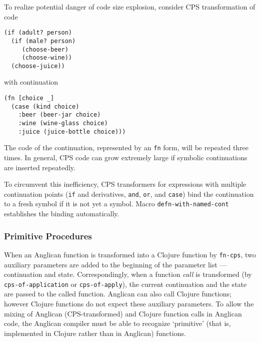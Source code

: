 \documentclass[preprint]{sigplanconf}
\begin{document}
To realize potential danger of code size explosion, consider
CPS transformation of code
\begin{lstlisting}[style=default]
(if (adult? person)
  (if (male? person)
     (choose-beer)
     (choose-wine))
  (choose-juice))
\end{lstlisting}
with continuation 
\begin{lstlisting}[style=default]
(fn [choice _]
  (case (kind choice)
    :beer (beer-jar choice)
    :wine (wine-glass choice)
    :juice (juice-bottle choice)))
\end{lstlisting}
The code of the continuation, represented by an \texttt{fn}
form, will be repeated three times. In general, CPS code can
grow extremely large if symbolic continuations are inserted
repeatedly.

To circumvent this inefficiency, CPS transformers for
expressions with multiple continuation points (\texttt{if} and
derivatives, \texttt{and}, \texttt{or}, and \texttt{case}) bind
the continuation to a fresh symbol if it is not yet a symbol.
Macro \texttt{defn-with-named-cont} establishes the binding
automatically.

\subsubsection{Primitive Procedures}

When an Anglican function is transformed into a Clojure function
by \texttt{fn-cps}, two auxiliary parameters are added to the
beginning of the parameter list --- continuation and state.
Correspondingly, when a function \textit{call} is transformed
(by \texttt{cps-of-application} or \texttt{cps-of-apply}), the
current continuation and the state are passed to the called
function. Anglican can also call Clojure functions; however
Clojure functions do not expect these auxiliary parameters.
To allow the mixing of Anglican (CPS-transformed) and Clojure
function calls in Anglican code, the Anglican compiler must be
able to recognize `primitive' (that is, implemented in Clojure
rather than in Anglican) functions. 
\end{document}
